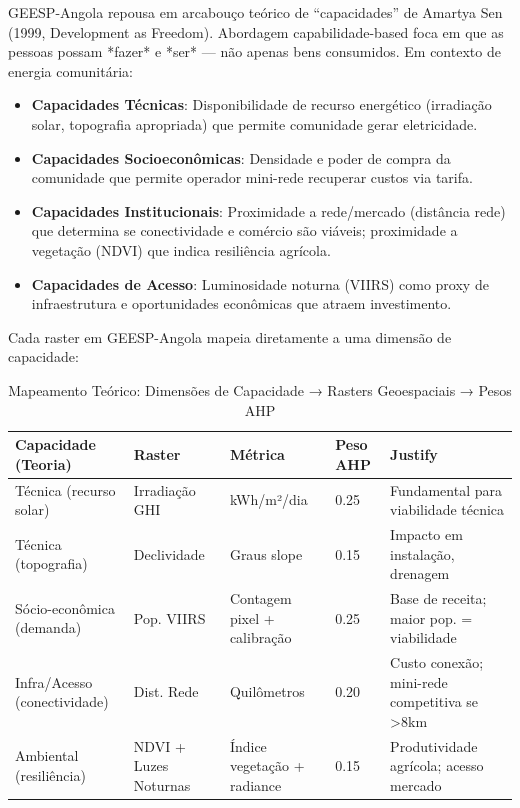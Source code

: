 \documentclass[12pt, a4paper]{article}
\begin{document}
GEESP-Angola repousa em arcabouço teórico de ``capacidades'' de Amartya Sen (1999, Development as Freedom). Abordagem capabilidade-based foca em que as pessoas possam *fazer* e *ser* — não apenas bens consumidos. Em contexto de energia comunitária:

\begin{itemize}
\item \textbf{Capacidades Técnicas}: Disponibilidade de recurso energético (irradiação solar, topografia apropriada) que permite comunidade gerar eletricidade.

\item \textbf{Capacidades Socioeconômicas}: Densidade e poder de compra da comunidade que permite operador mini-rede recuperar custos via tarifa.

\item \textbf{Capacidades Institucionais}: Proximidade a rede/mercado (distância rede) que determina se conectividade e comércio são viáveis; proximidade a vegetação (NDVI) que indica resiliência agrícola.

\item \textbf{Capacidades de Acesso}: Luminosidade noturna (VIIRS) como proxy de infraestrutura e oportunidades econômicas que atraem investimento.
\end{itemize}

Cada raster em GEESP-Angola mapeia diretamente a uma dimensão de capacidade:

\begin{table}[H]
\centering
\caption{Mapeamento Teórico: Dimensões de Capacidade → Rasters Geoespaciais → Pesos AHP}
\label{tab:theory_mapping}
\small
\begin{tabular}{|l|l|l|l|l|}
\hline
\textbf{Capacidade (Teoria)} & \textbf{Raster} & \textbf{Métrica} & \textbf{Peso AHP} & \textbf{Justify} \\
\hline
Técnica (recurso solar) & Irradiação GHI & kWh/m²/dia & 0.25 & Fundamental para viabilidade técnica \\
\hline
Técnica (topografia) & Declividade & Graus slope & 0.15 & Impacto em instalação, drenagem \\
\hline
Sócio-econômica (demanda) & Pop. VIIRS & Contagem pixel + calibração & 0.25 & Base de receita; maior pop. = viabilidade \\
\hline
Infra/Acesso (conectividade) & Dist. Rede & Quilômetros & 0.20 & Custo conexão; mini-rede competitiva se >8km \\
\hline
Ambiental (resiliência) & NDVI + Luzes Noturnas & Índice vegetação + radiance & 0.15 & Produtividade agrícola; acesso mercado \\
\hline
\end{tabular}
\end{table}
\end{document}
